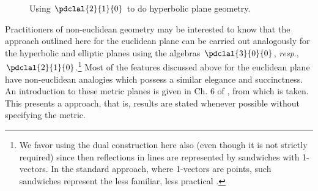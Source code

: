 \documentclass{birkjour}
\begin{document}
  \begin{figure}[t]
   \centering
{\setlength\fboxsep{0pt}}
\caption{Using $\pdclal{2}{1}{0}$ to do hyperbolic plane geometry.}
\label{fig:hypplane}
\end{figure}


Practitioners of non-euclidean geometry may be interested to know that the approach outlined here for the euclidean plane  can be carried out analogously for the hyperbolic and elliptic planes using the algebras $\pdclal{3}{0}{0}$, \textit{resp}., $\pdclal{2}{1}{0}$.\footnote{We favor using the dual construction here also (even though it is not strictly required) since then reflections in lines are represented by sandwiches with 1-vectors.  In the standard approach, where 1-vectors are points, such sandwiches represent the less familiar, less practical .} 
Most of the features discussed above for the euclidean plane have non-euclidean analogies which possess a similar elegance and succinctness. An introduction to these metric planes is given in Ch. 6 of \cite{gunnThesis}, from which  is taken. This presents a \emph{\MN} approach, that is, results are stated whenever possible without specifying the metric. %

\vspace{-.1in}
\end{document}
